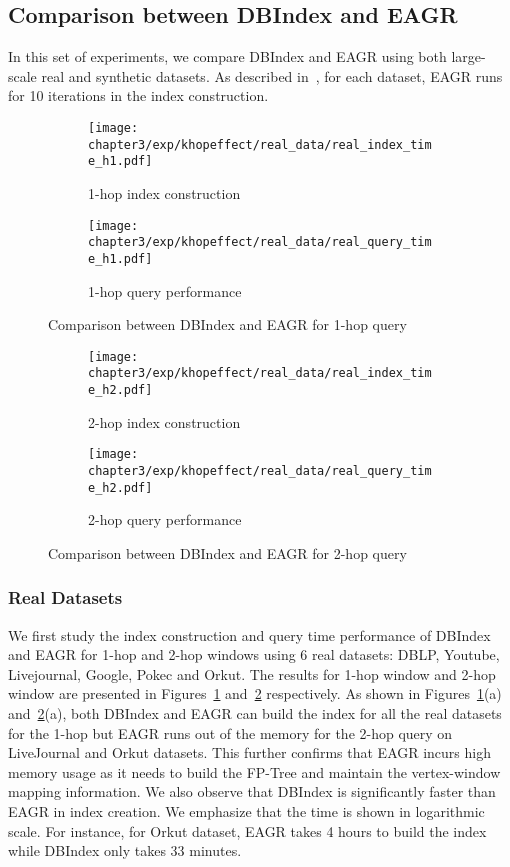 \subsection{Comparison between DBIndex and EAGR}

In this set of experiments, we compare DBIndex and 
EAGR \cite{mondal2014eagr} using both large-scale real 
and synthetic datasets. As described in~\cite{mondal2014eagr},
for each dataset, EAGR runs for 10 
iterations in the index construction.

\begin{figure}[h]
\centering
\begin{subfigure}{0.45\linewidth}
  \centering
  \texttt{[image: chapter3/exp/khopeffect/real\_data/real\_index\_time\_h1.pdf]}
  \caption{1-hop index construction}
\end{subfigure} \begin{subfigure}{0.45\linewidth}
  \centering
  \texttt{[image: chapter3/exp/khopeffect/real\_data/real\_query\_time\_h1.pdf]}
  \caption{1-hop query performance}
\end{subfigure}%
\caption{Comparison between DBIndex and EAGR  for 1-hop query}
\label{fig:1-hop-real}
\end{figure}

\begin{figure}[h]
\centering
\begin{subfigure}{0.45\linewidth}
  \centering
  \texttt{[image: chapter3/exp/khopeffect/real\_data/real\_index\_time\_h2.pdf]}
  \caption{2-hop index construction}
\end{subfigure}
\begin{subfigure}{0.45\linewidth}
  \centering
  \texttt{[image: chapter3/exp/khopeffect/real\_data/real\_query\_time\_h2.pdf]}
  \caption{2-hop query performance}
\end{subfigure}
\caption{Comparison between DBIndex and EAGR for 2-hop query}
\label{fig:2-hop-real}
\end{figure}

\subsubsection{Real Datasets} 
We first study the index construction and 
query time performance of DBIndex and EAGR for 1-hop and 2-hop windows 
using 6 real datasets: DBLP, Youtube, Livejournal, Google, Pokec and Orkut. 
The results for 1-hop window and 2-hop window are presented
in Figures~\ref{fig:1-hop-real} and~\ref{fig:2-hop-real} 
respectively. 
As shown in Figures~\ref{fig:1-hop-real}(a) and~\ref{fig:2-hop-real}(a), both DBIndex and EAGR can build the index for all
the real datasets for the 1-hop but EAGR runs out of the memory for the 2-hop query on LiveJournal and Orkut datasets. This further confirms that EAGR incurs 
high memory usage as it needs to build the FP-Tree and 
maintain the vertex-window mapping information. We also observe that 
DBIndex is significantly faster than EAGR in index creation. 
We emphasize that the time is shown in logarithmic scale. 
For instance, for Orkut dataset, EAGR takes 4 hours to build the index 
while DBIndex only takes 33 minutes. 

